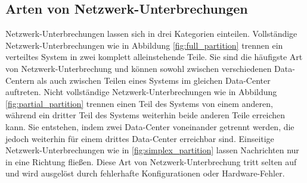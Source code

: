\documentclass[12pt,a4paper]{report}
\begin{document}
\subsection{Arten von Netzwerk-Unterbrechungen}
Netzwerk-Unterbrechungen lassen sich in drei Kategorien einteilen. Vollstän\-dige Netzwerk-Unterbrechungen wie in Abbildung
\ref{fig:full_partition} trennen ein verteiltes System in zwei komplett alleinstehende Teile. Sie sind die häufigste Art von
Netzwerk-Unterbrechung und können sowohl zwischen verschiedenen Data-Centern als auch zwischen Teilen eines Systems im gleichen
Data-Center auftreten. Nicht vollständige Netzwerk-Unterbrechungen wie in Abbildung \ref{fig:partial_partition} trennen einen Teil des
Systems von einem anderen, während ein dritter Teil des Systems weiterhin beide anderen Teile erreichen kann. Sie entstehen, indem
zwei Data-Center voneinander getrennt werden, die jedoch weiterhin für einem drittes Data-Center erreichbar sind. Einseitige
Netzwerk-Unterbrechungen wie in \ref{fig:simplex_partition} lassen Nachrichten nur in eine Richtung fließen. Diese Art von
Netzwerk-Unterbrechung tritt selten auf und wird ausgelöst durch fehlerhafte Konfigurationen oder Hardware-Fehler.
\cite{analysis_of_network_partition_failures}
\end{document}

